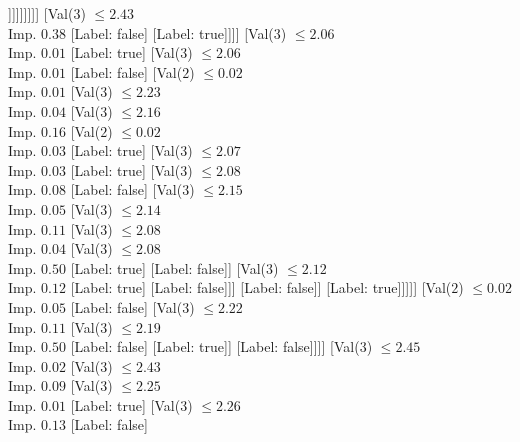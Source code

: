 \documentclass[margin=10pt]{standalone}
\begin{document}
\begin{forest}
																			]]]]]]]]
											[Val($3$) $ \leq 2.43$ \\ Imp. $0.38$
												[Label: false]
												[Label: true]]]]
									[Val($3$) $ \leq 2.06$ \\ Imp. $0.01$
										[Label: true]
										[Val($3$) $ \leq 2.06$ \\ Imp. $0.01$
											[Label: false]
											[Val($2$) $ \leq 0.02$ \\ Imp. $0.01$
												[Val($3$) $ \leq 2.23$ \\ Imp. $0.04$
													[Val($3$) $ \leq 2.16$ \\ Imp. $0.16$
														[Val($2$) $ \leq 0.02$ \\ Imp. $0.03$
															[Label: true]
															[Val($3$) $ \leq 2.07$ \\ Imp. $0.03$
																[Label: true]
																[Val($3$) $ \leq 2.08$ \\ Imp. $0.08$
																	[Label: false]
																	[Val($3$) $ \leq 2.15$ \\ Imp. $0.05$
																		[Val($3$) $ \leq 2.14$ \\ Imp. $0.11$
																			[Val($3$) $ \leq 2.08$ \\ Imp. $0.04$
																				[Val($3$) $ \leq 2.08$ \\ Imp. $0.50$
																					[Label: true]
																					[Label: false]]
																				[Val($3$) $ \leq 2.12$ \\ Imp. $0.12$
																					[Label: true]
																					[Label: false]]]
																			[Label: false]]
																		[Label: true]]]]]
														[Val($2$) $ \leq 0.02$ \\ Imp. $0.05$
															[Label: false]
															[Val($3$) $ \leq 2.22$ \\ Imp. $0.11$
																[Val($3$) $ \leq 2.19$ \\ Imp. $0.50$
																	[Label: false]
																	[Label: true]]
																[Label: false]]]]
													[Val($3$) $ \leq 2.45$ \\ Imp. $0.02$
														[Val($3$) $ \leq 2.43$ \\ Imp. $0.09$
															[Val($3$) $ \leq 2.25$ \\ Imp. $0.01$
																[Label: true]
																[Val($3$) $ \leq 2.26$ \\ Imp. $0.13$
																	[Label: false]

\end{forest}
\end{document}
